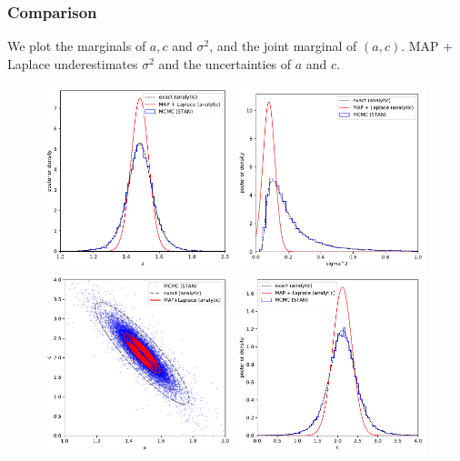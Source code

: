 \documentclass[10pt,oneside]{article}
\begin{document}
\subsubsection*{Comparison}
We plot the marginals of $a, c$ and $\sigma^2$, and the joint marginal of $(a,c)$. MAP + Laplace  underestimates $\sigma^2$ and the uncertainties of $a$ and $c$.
\begin{figure}[h]
\centering
\includegraphics[width=0.49\textwidth]{P1_a_posterior.pdf}
\includegraphics[width=0.49\textwidth]{P1_sigma2_posterior.pdf}
\includegraphics[width=0.49\textwidth]{P1_ac_joint_posterior.pdf}
\includegraphics[width=0.49\textwidth]{P1_c_posterior.pdf}
\end{figure}
\end{document}
